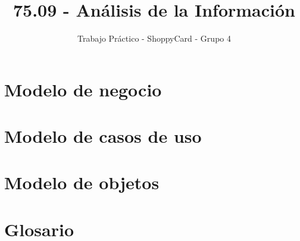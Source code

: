 \documentclass{scrartcl}
\title{75.09 - Análisis de la Información}
\subtitle{Trabajo Práctico - ShoppyCard - Grupo 4}
\date{}
\author{}
\begin{document}
\maketitle
\tableofcontents
\clearpage

\part{Modelo de negocio}

\clearpage

\part{Modelo de casos de uso}

\clearpage

\part{Modelo de objetos}

\clearpage

\part{Glosario}

\end{document}

